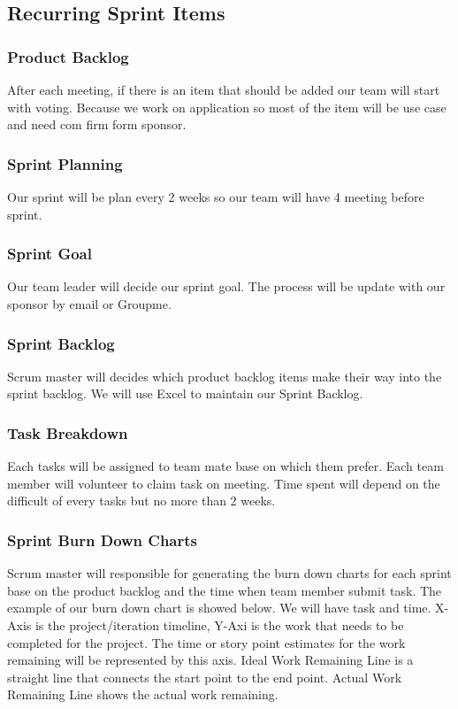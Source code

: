 \subsection{Recurring Sprint Items}

\subsubsection{Product Backlog}

After each meeting, if there is an item that should be added our team will start with voting. Because we work on application so most of the item will be use case and need com firm form sponsor.
\subsubsection{Sprint Planning}

Our sprint will be plan every 2 weeks so our team will have 4 meeting before sprint. 

\subsubsection{Sprint Goal}

Our team leader will decide our sprint goal. The process will be update with our sponsor by email or Groupme.
\subsubsection{Sprint Backlog}

Scrum master will decides  which product backlog items make their way into the sprint backlog. We will use Excel to maintain our Sprint Backlog.
\subsubsection{Task Breakdown}

Each tasks will be assigned to team mate base on which them prefer. Each team member will volunteer to claim task on meeting. Time spent will depend on the difficult of every tasks but no more than 2 weeks.

\subsubsection{Sprint Burn Down Charts}

Scrum master will responsible for generating the burn down charts for each sprint base on the product backlog and the time when team member submit task. The example of our burn down chart is showed below. We will have task and time. X-Axis is the project/iteration timeline, Y-Axi is the work that needs to be completed for the project. The time or story point estimates for the work remaining will be represented by this axis. Ideal Work Remaining Line is a straight line that connects the start point to the end point. Actual Work Remaining Line shows the actual work remaining.

